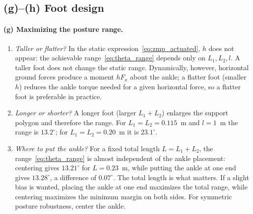 \documentclass[11pt]{article}
\begin{document}
\subsection{(g)--(h) Foot design}

\paragraph{(g) Maximizing the posture range.}
\begin{enumerate}[label=(\roman*),leftmargin=1.8em]
  \item \emph{Taller or flatter?}  In the static
        expression~\eqref{eq:zmp_actuated}, $h$ does not appear: the achievable
        range~\eqref{eq:theta_range} depends only on $L_1,L_2,l$.  A taller foot
        does not change the static range.  Dynamically, however, horizontal
        ground forces produce a moment $hF_x$ about the ankle; a flatter foot
        (smaller $h$) reduces the ankle torque needed for a given horizontal
        force, so a flatter foot is preferable in practice.
  \item \emph{Longer or shorter?}  A longer foot (larger $L_1+L_2$) enlarges
        the support polygon and therefore the range.  For $L_1=L_2=0.115$~m
        and $l=1$~m the range is $13.2^\circ$; for $L_1=L_2=0.20$~m it is
        $23.1^\circ$.
  \item \emph{Where to put the ankle?}  For a fixed total length $L=L_1+L_2$,
        the range~\eqref{eq:theta_range} is almost independent of the ankle
        placement: centering gives $13.21^\circ$ for $L=0.23$~m, while putting
        the ankle at one end gives $13.28^\circ$, a difference of
        $0.07^\circ$.  The total length is what matters.  If a slight bias is
        wanted, placing the ankle at one end maximizes the total range, while
        centering maximizes the minimum margin on both sides.  For symmetric
        posture robustness, center the ankle.
\end{enumerate}
\end{document}
